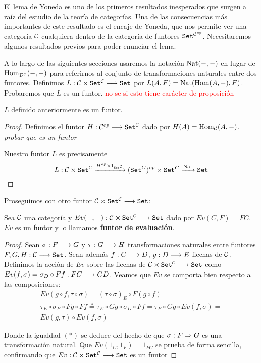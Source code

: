 El lema de Yoneda es uno de los primeros resultados
inesperados que surgen a raíz del
estudio de la teoría de categorías. Una
de las consecuencias más importantes de este resultado es
el encaje de Yoneda, que nos permite
ver una categoría $\mathcal{C}$ cualquiera dentro de la categoría de
funtores $\texttt{Set}^{\mathcal{C}^{op}}$. Necesitaremos algunos resultados
previos para poder enunciar el lema.

A lo largo de las siguientes
secciones usaremos la notación $\operatorname{Nat}(-, -)$ en lugar de
$\operatorname{Hom}_{\mathcal{D}^{\mathcal{C}}}(-, -)$ para referirnos al conjunto de
transformaciones naturales entre dos funtores. Definimos
$L : \mathcal{C}\times\texttt{Set}^{\mathcal{C}}\longrightarrow \texttt{Set}$ por
$L(A, F) = \operatorname{Nat}(\operatorname{Hom}(A, -), F)$. Probaremos que $L$ es un funtor. \textcolor{red}{no se si esto tiene carácter de proposición}

\begin{proposition*}
  $L$ definido anteriormente es un funtor.
\end{proposition*}
\begin{proof}
  Definimos el funtor
  $H: \mathcal{C}^{op}\longrightarrow \texttt{Set}^{\mathcal{C}}$ dado por
  $H(A) = \operatorname{Hom}_{\mathcal{C}}(A, -)$. \textit{probar que es un funtor}

  Nuestro funtor $L$ es precisamente
  $$L :\mathcal{C}\times\texttt{Set}^{\mathcal{C}}
  \xrightarrow{H^{op}\times 1_{\texttt{Set}^{\mathcal{C}}}}
  (\texttt{Set}^{C})^{op} \times \texttt{Set}^{C}
  \xrightarrow{\operatorname{Nat}} \texttt{Set}$$
\end{proof}
Proseguimos con otro funtor $\mathcal{C}\times\texttt{Set}^{\mathcal{C}}\longrightarrow \texttt{Set}$:

\begin{proposition*}
  Sea $\mathcal{C}$ una categoría y $Ev(-, -) : \mathcal{C}\times\texttt{Set}^{\mathcal{C}}\longrightarrow \texttt{Set}$
  dado por $Ev(C, F) = FC$. $Ev$ es un funtor y lo llamamos
  \textbf{funtor de evaluación}.
\end{proposition*}
\begin{proof}
  Sean $\sigma : F\longrightarrow G$ y $\tau : G\longrightarrow H$ transformaciones naturales entre funtores
  $F, G, H : \mathcal{C}\longrightarrow \texttt{Set}$. Sean además $f : C\longrightarrow D$,
  $g : D\longrightarrow E$ flechas de $\mathcal{C}$.
  Definimos la acción de $Ev$ sobre las flechas de
  $\mathcal{C}\times\texttt{Set}^{\mathcal{C}}\longrightarrow \texttt{Set}$ como
  $Ev(f, \sigma) = \sigma_D \circ Ff : FC\longrightarrow GD$. Veamos que $Ev$ se comporta bien
  respecto a las composiciones:
  \begin{multline*}
    Ev(g \circ f, \tau\circ\sigma) =
    (\tau \circ \sigma)_E\circ F(g\circ f) =\\
    \tau_E\circ\sigma_E\circ Fg \circ Ff \stackrel{*}{=}
  \tau_E\circ Gg \circ\sigma_D \circ Ff =
  \tau_E\circ Gg \circ Ev(f, \sigma) =\\
  Ev(g, \tau) \circ Ev(f, \sigma)
  \end{multline*}

  Donde la igualdad $(*)$ se deduce del hecho de que $\sigma : F\Rightarrow G$ es una transformación
  natural.
  Que $Ev(1_C, 1_F) = 1_{FC}$ se prueba de forma sencilla,
  confirmando que $Ev : \mathcal{C}\times\texttt{Set}^{\mathcal{C}}\longrightarrow \texttt{Set}$ es un funtor
\end{proof}

